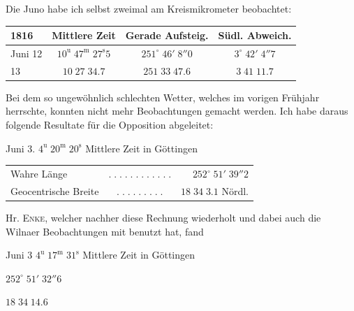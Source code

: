 \par\indent Die Juno habe ich selbst zweimal am Kreismikrometer beobachtet:
\begin{center}\fontsize{10}{12}\selectfont\setlength{\tabcolsep}{5pt}\begin{tabular}{l|c|c|c}
1816 & Mittlere Zeit & Gerade Aufsteig. & Südl. Abweich.\\\hline
Juni 12 & $10^{\mathrm u}\;47^{\mathrm m}\;27^{\mathrm s}5$ & $251^\circ\;46'\;8''0$ & $3^\circ\;42'\;4''7$\\
13 & $10\;27\;34.7$ & $251\;33\;47.6$ & $3\;41\;11.7$\\
\end{tabular}\end{center}

\par\indent Bei dem so ungewöhnlich schlechten Wetter, welches im vorigen Frühjahr herrschte, konnten nicht mehr Beobachtungen gemacht werden. Ich habe daraus folgende Resultate für die Opposition abgeleitet:
\begin{center}\fontsize{10}{12} Juni 3. $4^{\mathrm u}\;20^{\mathrm m}\;20^{\mathrm s}$ Mittlere Zeit in Göttingen\par
\setlength{\tabcolsep}{3pt}\begin{tabular}{lcr}
Wahre Länge & $.\;.\;.\;.\;.\;.\;.\;.\;.\;.\;.\;.$ & $252^\circ\;51'\;39''2$\\
Geocentrische Breite & $.\;.\;.\;.\;.\;.\;.\;.\;.$ & $18\;34\;3.1$ Nördl.\\
\end{tabular}\end{center}

\par\indent Hr. \textsc{Enke}, welcher nachher diese Rechnung wiederholt und dabei auch die Wilnaer Beobachtungen mit benutzt hat, fand
\begin{center}\fontsize{10}{12}\selectfont
Juni 3 \quad $4^{\mathrm u}\;17^{\mathrm m}\;31^{\mathrm s}$ \quad Mittlere Zeit in Göttingen\par
$252^\circ\;51'\;32''6$\par
$18\;34\;14.6$
\end{center}


